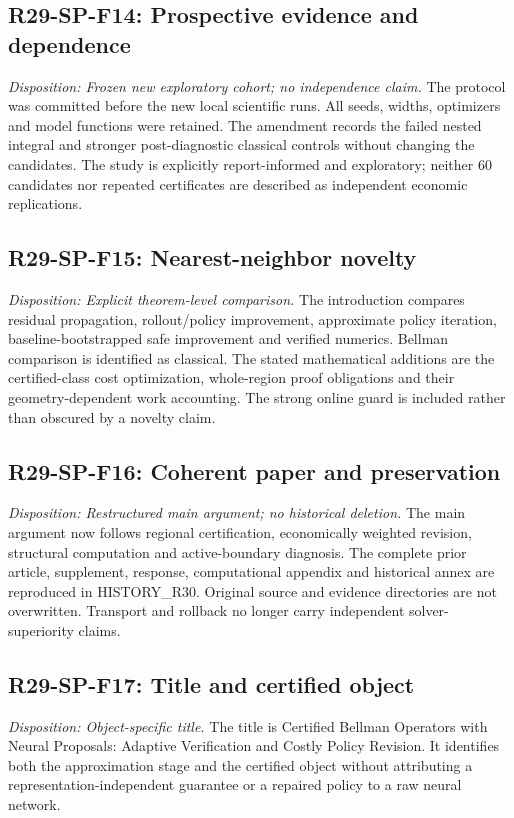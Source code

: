 \subsection{R29-SP-F14: Prospective evidence and dependence}
\textit{Disposition: Frozen new exploratory cohort; no independence claim.} The protocol was committed before the new local scientific runs. All seeds, widths, optimizers and model functions were retained. The amendment records the failed nested integral and stronger post-diagnostic classical controls without changing the candidates. The study is explicitly report-informed and exploratory; neither 60 candidates nor repeated certificates are described as independent economic replications.
\subsection{R29-SP-F15: Nearest-neighbor novelty}
\textit{Disposition: Explicit theorem-level comparison.} The introduction compares residual propagation, rollout/policy improvement, approximate policy iteration, baseline-bootstrapped safe improvement and verified numerics. Bellman comparison is identified as classical. The stated mathematical additions are the certified-class cost optimization, whole-region proof obligations and their geometry-dependent work accounting. The strong online guard is included rather than obscured by a novelty claim.
\subsection{R29-SP-F16: Coherent paper and preservation}
\textit{Disposition: Restructured main argument; no historical deletion.} The main argument now follows regional certification, economically weighted revision, structural computation and active-boundary diagnosis. The complete prior article, supplement, response, computational appendix and historical annex are reproduced in HISTORY\_R30. Original source and evidence directories are not overwritten. Transport and rollback no longer carry independent solver-superiority claims.
\subsection{R29-SP-F17: Title and certified object}
\textit{Disposition: Object-specific title.} The title is Certified Bellman Operators with Neural Proposals: Adaptive Verification and Costly Policy Revision. It identifies both the approximation stage and the certified object without attributing a representation-independent guarantee or a repaired policy to a raw neural network.
